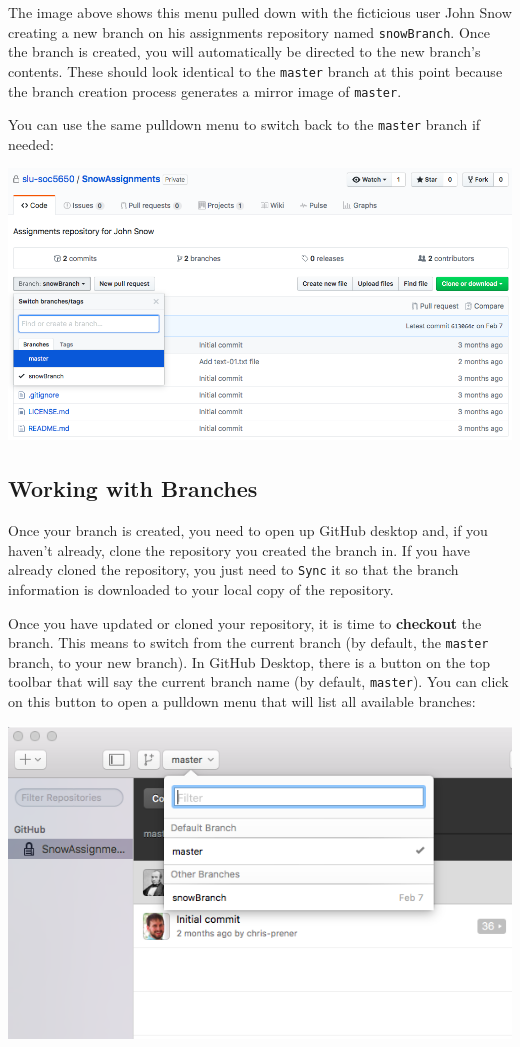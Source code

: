 \documentclass[]{book}
\theoremstyle{definition}
\theoremstyle{definition}
\theoremstyle{definition}
\theoremstyle{remark}
\begin{document}
The image above shows this menu pulled down with the ficticious user
John Snow creating a new branch on his assignments repository named
\texttt{snowBranch}. Once the branch is created, you will automatically
be directed to the new branch's contents. These should look identical to
the \texttt{master} branch at this point because the branch creation
process generates a mirror image of \texttt{master}.

You can use the same pulldown menu to switch back to the \texttt{master}
branch if needed:

\includegraphics[width=1\linewidth]{images/branch2}

\subsection{Working with Branches}\label{working-with-branches}

Once your branch is created, you need to open up GitHub desktop and, if
you haven't already, clone the repository you created the branch in. If
you have already cloned the repository, you just need to \texttt{Sync}
it so that the branch information is downloaded to your local copy of
the repository.

Once you have updated or cloned your repository, it is time to
\textbf{checkout} the branch. This means to switch from the current
branch (by default, the \texttt{master} branch, to your new branch). In
GitHub Desktop, there is a button on the top toolbar that will say the
current branch name (by default, \texttt{master}). You can click on this
button to open a pulldown menu that will list all available branches:

\includegraphics[width=1\linewidth]{images/branch3}
\end{document}
